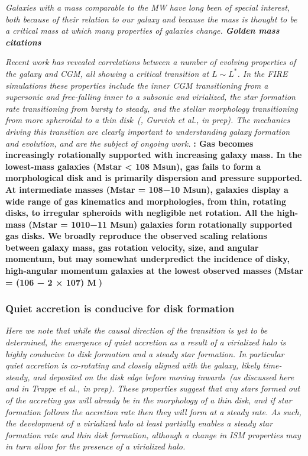 \documentclass[fleqn,usenatbib]{mnras}
\begin{document}
\textit{
Galaxies with a mass comparable to the MW have long been of special interest, both because of their relation to our galaxy and because the mass is thought to be a critical mass at which many properties of galaxies change.
\textbf{Golden mass citations}
}

\textit{
Recent work has revealed correlations between a number of evolving properties of the galaxy and CGM, all showing a critical transition at $L \sim L^*$.
In the FIRE simulations these properties include the inner CGM transitioning from a supersonic and free-falling inner to a subsonic and virialized, the star formation rate transitioning from bursty to steady, and the stellar morphology transitioning from more spheroidal to a thin disk~(\citealt{Stern2020, Yu2021}, Gurvich et al., in prep).
The mechanics driving this transition are clearly important to understanding galaxy formation and evolution, and are the subject of ongoing work.
}
\textbf{
\cite{el-badryGasKinematicsMorphology2018}:
Gas becomes increasingly rotationally supported with increasing galaxy mass. In the lowest-mass galaxies (Mstar < 108 Msun), gas fails to form a morphological disk and is primarily dispersion and pressure supported.
At intermediate masses (Mstar = 108−10 Msun), galaxies display a wide range of gas kinematics and morphologies, from thin, rotating disks, to irregular spheroids with negligible net rotation.
All the high-mass (Mstar = 1010−11 Msun) galaxies form rotationally supported gas disks.
We broadly reproduce the observed scaling relations between galaxy mass, gas rotation velocity, size, and angular momentum, but may somewhat underpredict the incidence of disky, high-angular momentum galaxies at the lowest observed masses (Mstar = (106 − 2 × 107) M)
}

\subsubsection{Quiet accretion is conducive for disk formation}

\textit{
Here we note that while the causal direction of the transition is yet to be determined, the emergence of quiet accretion as a result of a virialized halo is highly conducive to disk formation and a steady star formation.
In particular quiet accretion is co-rotating and closely aligned with the galaxy, likely time-steady, and deposited on the disk edge before moving inwards~(as discussed here and in Trappe et al., in prep).
These properties suggest that any stars formed out of the accreting gas will already be in the morphology of a thin disk, and if star formation follows the accretion rate then they will form at a steady rate.
As such, the development of a virialized halo at least partially enables a steady star formation rate and thin disk formation, although a change in ISM properties may in turn allow for the presence of a virialized halo.
}
\end{document}

